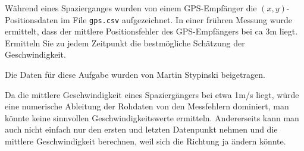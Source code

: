 Während eines Spazierganges wurden von einem GPS-Empfänger die
$(x,y)$-Positionsdaten im File \texttt{gps.csv} aufgezeichnet.
In einer frühren Messung wurde ermittelt, dass der mittlere Positionsfehler
des GPS-Empfängers bei ca 3m liegt.
Ermitteln Sie zu jedem Zeitpunkt die bestmögliche Schätzung 
der Geschwindigkeit.

Die Daten für diese Aufgabe wurden von Martin Stypinski beigetragen.


\begin{loesung}
Da die mittlere Geschwindigkeit eines Spaziergängers bei etwa 1m/s liegt,
würde eine numerische Ableitung der Rohdaten von den Messfehlern dominiert,
man könnte keine sinnvollen Geschwindigkeitswerte ermitteln.
Andererseits kann man auch nicht einfach nur den ersten und letzten
Datenpunkt nehmen und die mittlere Geschwindigkeit berechnen, weil
sich die Richtung ja ändern könnte.


\end{loesung}
